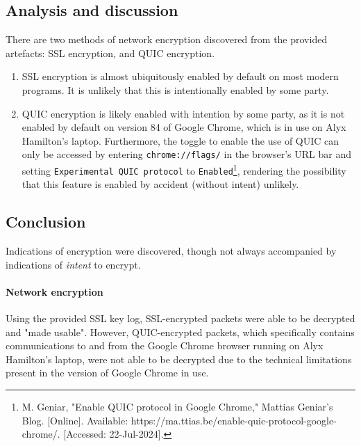 \subsection{Analysis and discussion} %
\label{sub:Analysis and discussion}
\begin{myenum}
	\item There are two methods of network encryption discovered from the provided artefacts: SSL encryption, and QUIC encryption.
		\begin{enumerate}
			\item SSL encryption is almost ubiquitously enabled by default on most modern programs. It is unlikely that this is intentionally enabled by some party.
			\item QUIC encryption is likely enabled with intention by some party, as it is not enabled by default on version 84 of Google Chrome, which is in use on Alyx Hamilton's laptop. Furthermore, the toggle to enable the use of QUIC can only be accessed by entering \texttt{chrome://flags/} in the browser's URL bar and setting \texttt{Experimental QUIC protocol} to \texttt{Enabled}\footnote{M. Geniar, "Enable QUIC protocol in Google Chrome," Mattias Geniar's Blog. [Online]. Available: https://ma.ttias.be/enable-quic-protocol-google-chrome/. [Accessed: 22-Jul-2024].}, rendering the possibility that this feature is enabled by accident (without intent) unlikely.
		\end{enumerate}
\end{myenum}
\subsection{Conclusion} %
\label{sub:Conclusion}

Indications of encryption were discovered, though not always accompanied by indications of \emph{intent} to encrypt.
\paragraph{Network encryption} %
\label{par:Network encryption}

Using the provided SSL key log, SSL-encrypted packets were able to be decrypted and "made usable". However, QUIC-encrypted packets, which specifically contains communications to and from the Google Chrome browser running on Alyx Hamilton's laptop, were not able to be decrypted due to the technical limitations present in the version of Google Chrome in use.

